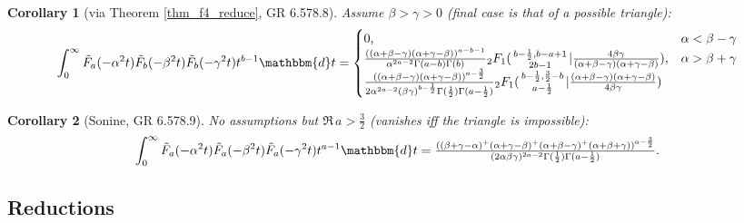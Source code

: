 \documentclass[12pt]{article}
\newcommand{\dd}[0] {\mathbbm{d}}
\numberwithin{equation}{section}
\newtheorem{theorem}{Theorem}[section]
\newtheorem{corollary}[theorem]{Corollary}
\newcommand{\Head}[3] {{}_{#1}{#2}_{#3}}
\newcommand{\ArgS}[3] {( \begin{smallmatrix} #1 \\ #2 \end{smallmatrix} | {#3})}
\newcommand{\HypJ}[2] {F_{#1}(#2)}
\newcommand{\HypJreg}[2] {{\tilde{F}}_{#1}(#2)}
\begin{document}
\begin{corollary}[via Theorem \ref{thm_f4_reduce}, GR 6.578.8]
Assume $\beta > \gamma > 0$ (final case is that of a possible triangle):
\begin{equation*}
\int_{0}^{\infty} \HypJreg{a}{-\alpha^2 t} \HypJreg{b}{-\beta^2 t} \HypJreg{b}{-\gamma^2 t} t^{b-1} \dd t = \begin{cases}
0 \text{,} &\alpha < \beta-\gamma\\
\frac{((\alpha+\beta-\gamma)(\alpha+\gamma-\beta))^{a-b-1}}{\alpha^{2a-2}\Gamma(a-b)\Gamma(b)} \Head{2}{F}{1} \ArgS{b-\frac12,b-a+1}{2b-1}{\tfrac{4\beta\gamma}{(\alpha+\beta-\gamma)(\alpha+\gamma-\beta)}} \text{,} &\alpha > \beta + \gamma\\
\frac{((\alpha+\beta-\gamma)(\alpha+\gamma-\beta))^{a-\frac32}}{2\alpha^{2a-2}(\beta \gamma)^{b-\frac12} \Gamma(\frac12) \Gamma(a-\frac12)} \Head{2}{F}{1} \ArgS{b-\frac12,\frac32-b}{a-\frac12}{\tfrac{(\alpha+\beta-\gamma)(\alpha+\gamma-\beta)}{4\beta\gamma}}
\end{cases}
\end{equation*}
\end{corollary}
\begin{corollary}[Sonine, GR 6.578.9] No assumptions but $\Re \, a > \tfrac32$ (vanishes iff the triangle is impossible):
\label{cor_jjj_sonine}
\begin{equation*}
\int_{0}^{\infty} \HypJreg{a}{-\alpha^2 t} \HypJreg{a}{-\beta^2 t} \HypJreg{a}{-\gamma^2 t} t^{a-1} \dd t = 
\tfrac{((\beta+\gamma-\alpha)^+(\alpha+\gamma-\beta)^+(\alpha+\beta-\gamma)^+ (\alpha+\beta+\gamma))^{a-\frac32}}{(2\alpha \beta \gamma)^{2a-2} \Gamma(\frac12) \Gamma(a-\frac12)}\text{.}
\end{equation*}
\end{corollary}


\subsection{Reductions}
\end{document}
